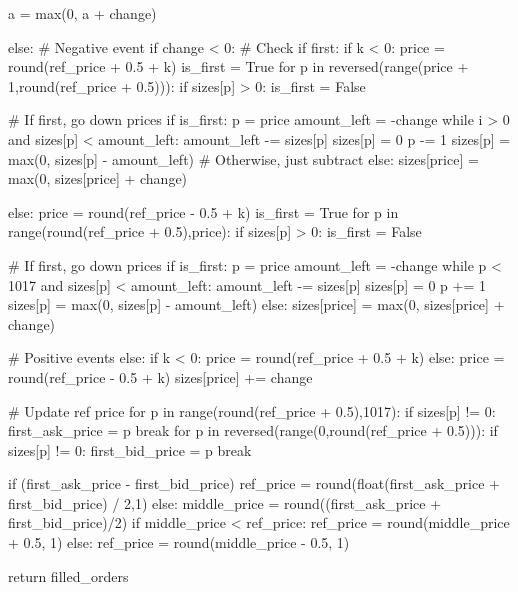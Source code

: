                 a = max(0, a + change)
            
            else:    
                # Negative event
                if change < 0:
                    # Check if first:
                    if k < 0:
                        price = round(ref_price + 0.5 + k)
                        is_first = True
                        for p in reversed(range(price + 1,round(ref_price + 0.5))):
                            if sizes[p] > 0:
                                is_first = False

                        # If first, go down prices
                        if is_first:
                            p = price
                            amount_left = -change
                            while i > 0 and sizes[p] < amount_left:
                                amount_left -= sizes[p]
                                sizes[p] = 0
                                p -= 1
                            sizes[p] = max(0, sizes[p] - amount_left)
                        # Otherwise, just subtract
                        else:
                            sizes[price] = max(0, sizes[price] + change) 

                    else:
                        price = round(ref_price - 0.5 + k)
                        is_first = True
                        for p in range(round(ref_price + 0.5),price):
                            if sizes[p] > 0:
                                is_first = False

                        # If first, go down prices
                        if is_first:
                            p = price
                            amount_left = -change
                            while p < 1017 and sizes[p] < amount_left:
                                amount_left -= sizes[p]
                                sizes[p] = 0
                                p += 1
                            sizes[p] = max(0, sizes[p] - amount_left)
                        else:
                            sizes[price] = max(0, sizes[price] + change)

                # Positive events
                else:
                    if k < 0:
                        price = round(ref_price + 0.5 + k)
                    else:
                        price = round(ref_price - 0.5 + k)
                    sizes[price] += change
                
            # Update ref price
            for p in range(round(ref_price + 0.5),1017):
                if sizes[p] != 0:
                    first_ask_price = p
                    break
            for p in reversed(range(0,round(ref_price + 0.5))):
                if sizes[p] != 0:
                    first_bid_price = p
                    break
        
            if (first_ask_price - first_bid_price) %
                ref_price = round(float(first_ask_price + first_bid_price) / 2,1)
            else:
                middle_price = round((first_ask_price + first_bid_price)/2)
                if middle_price < ref_price:
                    ref_price = round(middle_price + 0.5, 1)
                else:
                    ref_price = round(middle_price - 0.5, 1)
                    
    return filled_orders